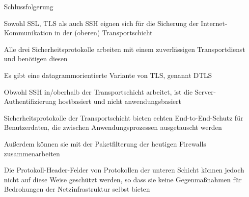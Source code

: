 \documentclass[a4paper]{article}
\begin{document}
\begin{multicols}{3}
      Schlussfolgerung
      \begin{itemize*}
            \item Sowohl SSL, TLS als auch SSH eignen sich für die Sicherung der Internet-Kommunikation in der (oberen) Transportschicht
            \item Alle drei Sicherheitsprotokolle arbeiten mit einem zuverlässigen Transportdienst und benötigen diesen
            \item Es gibt eine datagrammorientierte Variante von TLS, genannt DTLS
            \item Obwohl SSH in/oberhalb der Transportschicht arbeitet, ist die Server-Authentifizierung hostbasiert und nicht anwendungsbasiert
            \item Sicherheitsprotokolle der Transportschicht bieten echten End-to-End-Schutz für Benutzerdaten, die zwischen Anwendungsprozessen ausgetauscht werden
            \item Außerdem können sie mit der Paketfilterung der heutigen Firewalls zusammenarbeiten
            \item Die Protokoll-Header-Felder von Protokollen der unteren Schicht können jedoch nicht auf diese Weise geschützt werden, so dass sie keine Gegenmaßnahmen für Bedrohungen der Netzinfrastruktur selbst bieten
      \end{itemize*}
      \columnbreak


\end{multicols}
\end{document}
